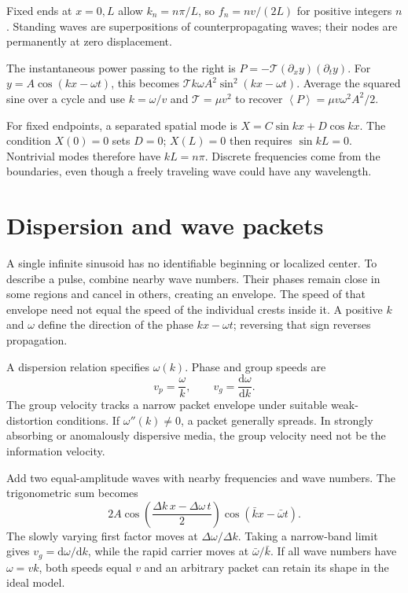 \documentclass[11pt,oneside]{book}
\newcommand{\dd}{\mathrm{d}}
\newcommand{\avg}[1]{\left\langle #1\right\rangle}
\newcommand{\od}[2]{\frac{\dd #1}{\dd #2}}
\theoremstyle{reviewstyle}
\begin{document}
Fixed ends at $x=0,L$ allow $k_n=n\pi/L$, so $f_n=nv/(2L)$ for positive integers $n$. Standing waves are superpositions of counterpropagating waves; their nodes are permanently at zero displacement.

The instantaneous power passing to the right is $P=-\mathcal T(\partial_xy)(\partial_ty)$. For $y=A\cos(kx-\omega t)$, this becomes $\mathcal T k\omega A^2\sin^2(kx-\omega t)$. Average the squared sine over a cycle and use $k=\omega/v$ and $\mathcal T=\mu v^2$ to recover $\avg P=\mu v\omega^2A^2/2$.

For fixed endpoints, a separated spatial mode is $X=C\sin kx+D\cos kx$. The condition $X(0)=0$ sets $D=0$; $X(L)=0$ then requires $\sin kL=0$. Nontrivial modes therefore have $kL=n\pi$. Discrete frequencies come from the boundaries, even though a freely traveling wave could have any wavelength.

\section{Dispersion and wave packets}
A single infinite sinusoid has no identifiable beginning or localized center. To describe a pulse, combine nearby wave numbers. Their phases remain close in some regions and cancel in others, creating an envelope. The speed of that envelope need not equal the speed of the individual crests inside it. A positive $k$ and $\omega$ define the direction of the phase $kx-\omega t$; reversing that sign reverses propagation.

A dispersion relation specifies $\omega(k)$. Phase and group speeds are
\begin{equation}
v_p=\frac{\omega}{k},\qquad v_g=\od{\omega}{k}.
\end{equation}
The group velocity tracks a narrow packet envelope under suitable weak-distortion conditions. If $\omega''(k)\neq0$, a packet generally spreads. In strongly absorbing or anomalously dispersive media, the group velocity need not be the information velocity.

Add two equal-amplitude waves with nearby frequencies and wave numbers. The trigonometric sum becomes
\begin{equation}
2A\cos\left(\frac{\Delta k\,x-\Delta\omega\,t}{2}\right)
\cos(\bar kx-\bar\omega t).
\end{equation}
The slowly varying first factor moves at $\Delta\omega/\Delta k$. Taking a narrow-band limit gives $v_g=\dd\omega/\dd k$, while the rapid carrier moves at $\bar\omega/\bar k$. If all wave numbers have $\omega=vk$, both speeds equal $v$ and an arbitrary packet can retain its shape in the ideal model.
\end{document}
